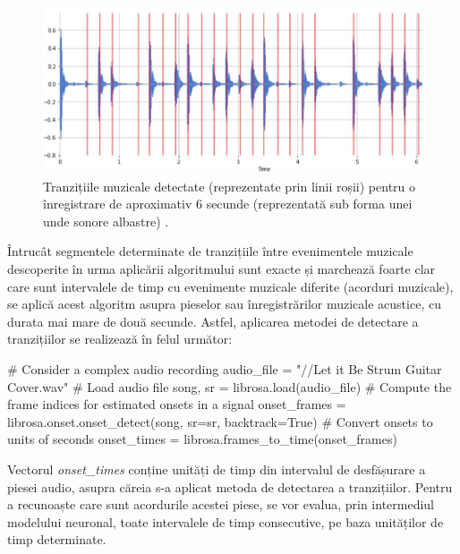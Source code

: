 \documentclass[a4paper,12pt]{report}
\begin{document}
\begin{figure}[h!]
    \centering
    \includegraphics[width=15cm]{..//resources//images//wave_onset_detection.JPG} 
    \caption{Tranzițiile muzicale detectate (reprezentate prin linii roșii) 
pentru o înregistrare de aproximativ 6 secunde (reprezentată sub forma unei unde sonore albastre) \cite{WEBSITE:onset-detection}.}
\end{figure}

Întrucât segmentele determinate de tranzițiile între evenimentele muzicale 
descoperite în urma aplicării algoritmului sunt exacte și marchează foarte clar 
care sunt intervalele de timp cu evenimente muzicale diferite (acorduri muzicale), 
se aplică acest algoritm asupra pieselor sau înregistrărilor muzicale acustice, 
cu durata mai mare de două secunde. Astfel, aplicarea metodei de detectare 
a tranzițiilor se realizează în felul următor:

\begin{python}
    # Consider a complex audio recording
    audio_file = "//Let it Be Strum Guitar Cover.wav"
    # Load audio file
    song, sr = librosa.load(audio_file)
    # Compute the frame indices for estimated onsets in a signal
    onset_frames = librosa.onset.onset_detect(song, sr=sr, 
                                              backtrack=True)  
    # Convert onsets to units of seconds
    onset_times = librosa.frames_to_time(onset_frames)                                    
\end{python}

Vectorul \emph{onset\_times} conține unități de timp din intervalul de desfășurare 
a piesei audio, asupra căreia s-a aplicat metoda de detectarea a tranzițiilor.
Pentru a recunoaște care sunt acordurile acestei piese, se vor evalua, 
prin intermediul modelului neuronal, toate intervalele de timp consecutive, pe 
baza unităților de timp determinate. 
\end{document}
